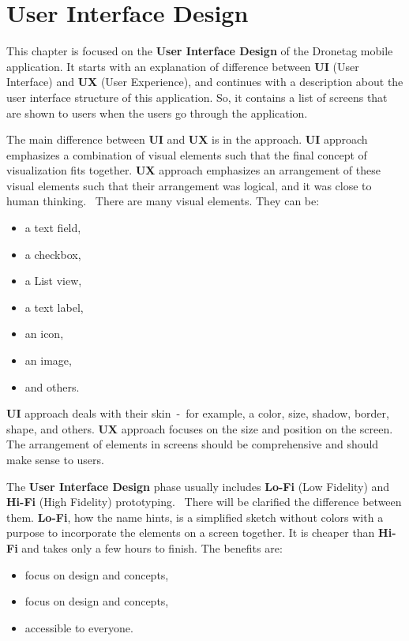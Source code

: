 \chapter{User Interface Design}\label{ch:user-interface-design}
This chapter is focused on the \textbf{User Interface Design} of the Dronetag mobile application.
It starts with an explanation of difference between \textbf{UI} (User Interface) and \textbf{UX} (User Experience), and continues with a description about the user interface structure of this application.
So, it contains a list of screens that are shown to users when the users go through the application.

The main difference between \textbf{UI} and \textbf{UX} is in the approach.
\textbf{UI} approach emphasizes a combination of visual elements such that the final concept of visualization fits together.
\textbf{UX} approach emphasizes an arrangement of these visual elements such that their arrangement was logical, and it was close to human thinking.~\cite{prototyping}
There are many visual elements.
They can be:
\begin{itemize}
    \item a text field,
    \item a checkbox,
    \item a List view,
    \item a text label,
    \item an icon,
    \item an image,
    \item and others.
\end{itemize}
\textbf{UI} approach deals with their skin~-~for example, a color, size, shadow, border, shape, and others.
\textbf{UX} approach focuses on the size and position on the screen.
The arrangement of elements in screens should be comprehensive and should make sense to users.

The \textbf{User Interface Design} phase usually includes \textbf{Lo-Fi} (Low Fidelity) and \textbf{Hi-Fi} (High Fidelity) prototyping.~\cite{effectivePrototyping}
There will be clarified the difference between them.
\textbf{Lo-Fi}, how the name hints, is a simplified sketch without colors with a purpose to incorporate the elements on a screen together.
It is cheaper than \textbf{Hi-Fi} and takes only a few hours to finish.
The benefits are:
\begin{itemize}
    \item focus on design and concepts,
    \item focus on design and concepts,
    \item accessible to everyone.~\cite{hiFiLoFiPrototypeArticle}
\end{itemize}

